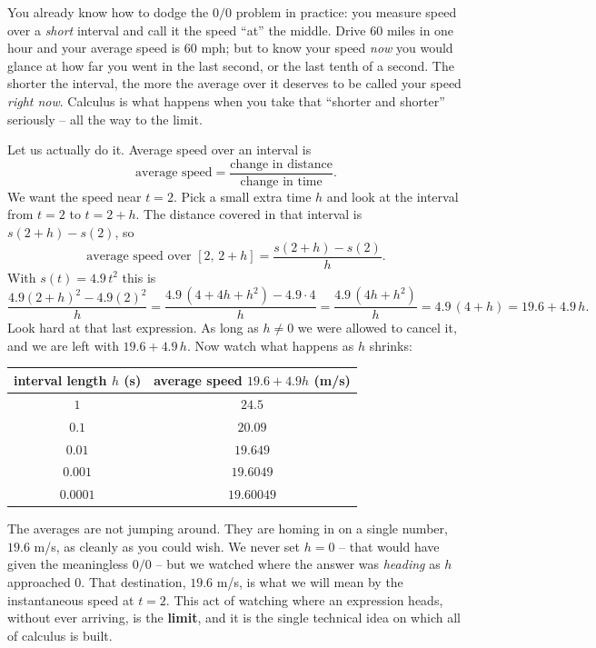 \begin{intuitionbox}
You already know how to dodge the $0/0$ problem in practice: you measure speed
over a \emph{short} interval and call it the speed ``at'' the middle. Drive $60$
miles in one hour and your average speed is $60$ mph; but to know your speed
\emph{now} you would glance at how far you went in the last second, or the last
tenth of a second. The shorter the interval, the more the average over it
deserves to be called your speed \emph{right now}. Calculus is what happens when
you take that ``shorter and shorter'' seriously -- all the way to the limit.
\end{intuitionbox}

Let us actually do it. Average speed over an interval is
\[
  \text{average speed} = \frac{\text{change in distance}}{\text{change in time}}.
\]
We want the speed near $t = 2$. Pick a small extra time $h$ and look at the
interval from $t = 2$ to $t = 2 + h$. The distance covered in that interval is
$s(2+h) - s(2)$, so
\[
  \text{average speed over } [2,\,2+h]
  = \frac{s(2+h) - s(2)}{h}.
\]
With $s(t) = 4.9\,t^2$ this is
\[
  \frac{4.9(2+h)^2 - 4.9(2)^2}{h}
  = \frac{4.9\,(4 + 4h + h^2) - 4.9\cdot 4}{h}
  = \frac{4.9\,(4h + h^2)}{h}
  = 4.9\,(4 + h) = 19.6 + 4.9\,h.
\]
Look hard at that last expression. As long as $h \neq 0$ we were allowed to
cancel it, and we are left with $19.6 + 4.9\,h$. Now watch what happens as $h$
shrinks:

\begin{center}
\begin{tabular}{cc}
\toprule
interval length $h$ (s) & average speed $19.6 + 4.9h$ (m/s) \\
\midrule
$1$       & $24.5$ \\
$0.1$     & $20.09$ \\
$0.01$    & $19.649$ \\
$0.001$   & $19.6049$ \\
$0.0001$  & $19.60049$ \\
\bottomrule
\end{tabular}
\end{center}

The averages are not jumping around. They are homing in on a single number,
$19.6$ m/s, as cleanly as you could wish. We never set $h = 0$ -- that would
have given the meaningless $0/0$ -- but we watched where the answer was
\emph{heading} as $h$ approached $0$. That destination, $19.6$ m/s, is what we
will mean by the instantaneous speed at $t = 2$. This act of watching where an
expression heads, without ever arriving, is the \textbf{limit}, and it is the
single technical idea on which all of calculus is built.

